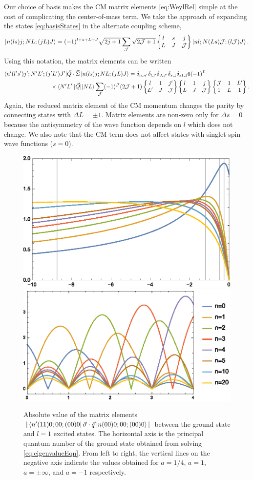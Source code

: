 \documentclass[%
 preprint,
 amsmath,amssymb,
 aps,
]{revtex4-1}
\newcommand{\sixj}[6]{ \begin{Bmatrix}
  #1 & #2 & #3 \\
  #4 & #5 & #6 
 \end{Bmatrix}}
\begin{document}
Our choice of basis makes the CM matrix elements \eqref{eq:WeylRel} simple at the cost of complicating the center-of-mass term. We take the approach of expanding the states \eqref{eq:basisStates} in the alternate coupling scheme,
\begin{equation}\label{eq:basisStates2}
\ket{n(ls)j;NL;(jL)J}=(-1)^{l+s+L+J}\sqrt{2j+1}\sum_{\mathcal{J}}\sqrt{2\mathcal{J}+1}\sixj{l}{s}{j}{L}{J}{\mathcal{J}}\ket{nl;N(Ls)\mathcal{J};(l\mathcal{J})J}.
\end{equation}
Using this notation, the matrix elements can be written
\begin{equation}\begin{split}
\bra{n'(l's')j';N'L';(j'L')J'}&\vec{Q}\cdot\vec{\Sigma} \ket{n(ls)j;NL;(jL)J} = \delta_{n,n'}\delta_{l,l'}\delta_{J,J'}\delta_{s,1}\delta_{s1,1}   6 (-1)^{L} \\
&\hspace{-1cm}\times\braket{N'L'|| \vec{Q} || NL} \sum_{\mathcal{J}}(-1)^\mathcal{J} (2\mathcal{J}+1)\sixj{l}{1}{j'}{L'}{J}{\mathcal{J}}\sixj{l}{1}{j}{L}{J}{\mathcal{J}}\sixj{\mathcal{J}}{1}{L'}{1}{L}{1}.
\end{split}
\end{equation}
Again, the reduced matrix element of the CM momentum changes the parity by connecting states with $\Delta L=\pm1$. Matrix elements are non-zero only for $\Delta s=0$ because the antisymmetry of the wave function depends on $l$ which does not change. We also note that the CM term does not affect states with singlet spin wave functions ($s=0$).


\begin{figure}
\includegraphics[height=0.28\linewidth]{Figures/sigma_dot_q_mat_elts}\nobreak
\includegraphics[height=0.278\linewidth]{Figures/sigma_dot_q_mat_elts2}
\caption{\label{fig:matrixElts}Absolute value of the matrix elements $|\bra{n'(11)0;00;(00)0}\vec{\sigma}\cdot\vec{q}\ket{n(00)0;00;(00)0}|$ between the ground state and $l=1$ excited states. The horizontal axis is the principal quantum number of the ground state obtained from solving  \eqref{eq:eigenvalueEqn}. From left to right, the vertical lines on the negative axis indicate the values obtained for $a=1/4$, $a=1$, $a=\pm\infty$, and $a=-1$ respectively.} 
\end{figure}
\end{document}
